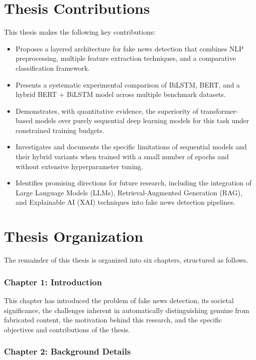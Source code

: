 \section{Thesis Contributions}

This thesis makes the following key contributions:

\begin{itemize}
\item Proposes a layered architecture for fake news detection that combines NLP preprocessing, multiple feature extraction techniques, and a comparative classification framework.
\item Presents a systematic experimental comparison of BiLSTM, BERT, and a hybrid BERT + BiLSTM model across multiple benchmark datasets.
\item Demonstrates, with quantitative evidence, the superiority of transformer-based models over purely sequential deep learning models for this task under constrained training budgets.
\item Investigates and documents the specific limitations of sequential models and their hybrid variants when trained with a small number of epochs and without extensive hyperparameter tuning.
\item Identifies promising directions for future research, including the integration of Large Language Models (LLMs), Retrieval-Augmented Generation (RAG), and Explainable AI (XAI) techniques into fake news detection pipelines.
\end{itemize}

\section{Thesis Organization}

The remainder of this thesis is organized into six chapters, structured as follows.

\subsubsection*{Chapter 1: Introduction}

This chapter has introduced the problem of fake news detection, its societal significance, the challenges inherent in automatically distinguishing genuine from fabricated content, the motivation behind this research, and the specific objectives and contributions of the thesis.

\subsubsection*{Chapter 2: Background Details}

